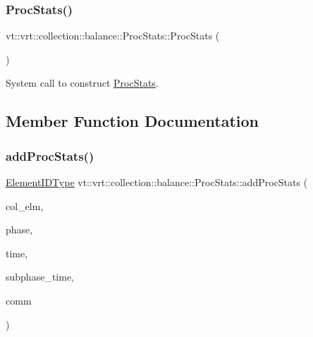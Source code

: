 \subsubsection{\texorpdfstring{Proc\+Stats()}{ProcStats()}}
{\footnotesize\ttfamily vt\+::vrt\+::collection\+::balance\+::\+Proc\+Stats\+::\+Proc\+Stats (\begin{DoxyParamCaption}{ }\end{DoxyParamCaption})\hspace{0.3cm}{\ttfamily [default]}}



System call to construct {\ttfamily \hyperlink{structvt_1_1vrt_1_1collection_1_1balance_1_1_proc_stats}{Proc\+Stats}}. 



\subsection{Member Function Documentation}
\mbox{\label{structvt_1_1vrt_1_1collection_1_1balance_1_1_proc_stats_a21164188d5d1d09724959e95e5c4f2e4}} 
\subsubsection{\texorpdfstring{add\+Proc\+Stats()}{addProcStats()}}
{\footnotesize\ttfamily \hyperlink{namespacevt_1_1vrt_1_1collection_1_1balance_a14c8d2c972f2913aa3f1636e5be0a120}{Element\+I\+D\+Type} vt\+::vrt\+::collection\+::balance\+::\+Proc\+Stats\+::add\+Proc\+Stats (\begin{DoxyParamCaption}\item[{\hyperlink{structvt_1_1vrt_1_1collection_1_1_migratable}{Migratable} $\ast$}]{col\+\_\+elm,  }\item[{\hyperlink{namespacevt_a46ce6733d5cdbd735d561b7b4029f6d7}{Phase\+Type} const \&}]{phase,  }\item[{\hyperlink{namespacevt_a876a9d0cd5a952859c72de8a46881442}{Time\+Type} const \&}]{time,  }\item[{std\+::vector$<$ \hyperlink{namespacevt_a876a9d0cd5a952859c72de8a46881442}{Time\+Type} $>$ const \&}]{subphase\+\_\+time,  }\item[{\hyperlink{namespacevt_1_1vrt_1_1collection_1_1balance_aa50d4cbbfa3c643e7303fc6e08f411fb}{Comm\+Map\+Type} const \&}]{comm }\end{DoxyParamCaption})}




